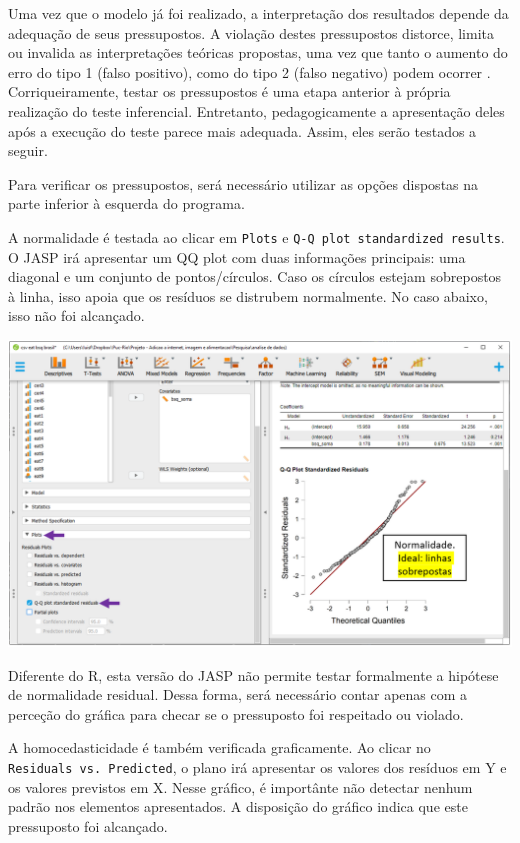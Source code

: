\documentclass[
]{book}
\begin{document}
Uma vez que o modelo já foi realizado, a interpretação dos resultados depende da adequação de seus pressupostos. A violação destes pressupostos distorce, limita ou invalida as interpretações teóricas propostas, uma vez que tanto o aumento do erro do tipo 1 (falso positivo), como do tipo 2 (falso negativo) podem ocorrer \citep{Lix1996, Barker2015, Ernst2017}. Corriqueiramente, testar os pressupostos é uma etapa anterior à própria realização do teste inferencial. Entretanto, pedagogicamente a apresentação deles após a execução do teste parece mais adequada. Assim, eles serão testados a seguir.

Para verificar os pressupostos, será necessário utilizar as opções dispostas na parte inferior à esquerda do programa.

A normalidade é testada ao clicar em \texttt{Plots} e \texttt{Q-Q\ plot\ standardized\ results}. O JASP irá apresentar um QQ plot com duas informações principais: uma diagonal e um conjunto de pontos/círculos. Caso os círculos estejam sobrepostos à linha, isso apoia que os resíduos se distrubem normalmente. No caso abaixo, isso não foi alcançado.

\includegraphics{./img/cap_reg_normalidade.png}

Diferente do R, esta versão do JASP não permite testar formalmente a hipótese de normalidade residual. Dessa forma, será necessário contar apenas com a perceção do gráfica para checar se o pressuposto foi respeitado ou violado.

A homocedasticidade é também verificada graficamente. Ao clicar no \texttt{Residuals\ vs.\ Predicted}, o plano irá apresentar os valores dos resíduos em Y e os valores previstos em X. Nesse gráfico, é importânte não detectar nenhum padrão nos elementos apresentados. A disposição do gráfico indica que este pressuposto foi alcançado.
\end{document}

